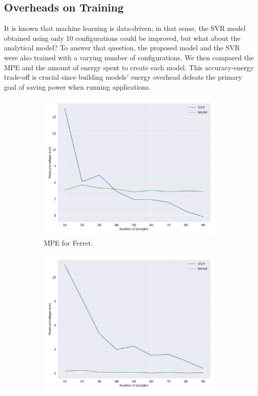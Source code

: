 \subsection{Overheads on Training} \label{subsec:overhead}
It is known that machine learning is data-driven; in that sense, the SVR model obtained using only 10 configurations could be improved, but what about the analytical model? 
To answer that question, the proposed model and the SVR were also trained with a varying number of configurations.
We then compared the MPE and the amount of energy spent to create each model. 
This accuracy-energy trade-off is crucial since building models' energy overhead defeats the primary goal of saving power when running applications.
\enlargethispage{.5cm}

\begin{figure}[H]
	\centering
	\captionsetup[subfigure]{justification=centering}
	\begin{subfigure}[b]{0.45\textwidth}
		\centerline{\includegraphics[width=\columnwidth]{models/figures/overhead/completo_ferret_4.pdf}}
		\caption{MPE for Ferret.}
		\label{fig:overhead_ferret}
	\end{subfigure}
	\begin{subfigure}[b]{0.45\textwidth}
		\centerline{\includegraphics[width=\columnwidth]{models/figures/overhead/completo_black_6.pdf}}

\end{subfigure}
\end{figure}
